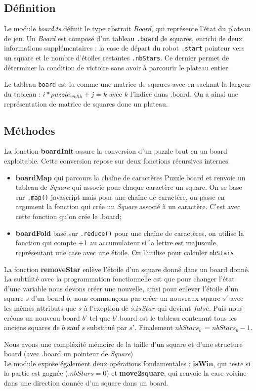 \subsection{Définition}

Le module \textit{board.ts} définit le type abstrait \textit{Board}, qui représente l'état du plateau de jeu. Un \textit{Board} est composé d'un tableau \texttt{.board} de squares, enrichi de deux informations supplémentaires : la case de départ du robot \texttt{.start} pointeur vers un square et le nombre d'étoiles restantes \texttt{.nbStars}. Ce dernier permet de déterminer la condition de victoire sans avoir à parcourir le plateau entier.

Le tableau \texttt{board} est lu comme une matrice de squares avec en sachant la largeur du tableau : $i * puzzle_{width} + j = k$ avec $k$ l’indice dans .board. On a ainsi une représentation de matrice de squares donc un plateau.

\subsection{Méthodes}

La fonction \textbf{boardInit} assure la conversion d'un puzzle brut en un board exploitable. Cette conversion repose sur deux fonctions récursives internes.
\begin{itemize}
	\item \textbf{boardMap} qui parcours la chaîne de caractères Puzzle.board et renvoie un tableau de \textit{Square} qui associe pour chaque caractère un square. On se base sur \texttt{.map()} javascript mais pour une chaîne de caractère, on passe en argument la fonction qui crée un \textit{Square} associé à un caractère. C’est avec cette fonction qu’on crée le .board;
	\item \textbf{boardFold} basé sur \texttt{.reduce()} pour une chaîne de caractères, on utilise la fonction qui compte +1 au accumulateur si la lettre est majuscule, représentant une case avec une étoile. On l'utilise pour calculer \texttt{nbStars}.
\end{itemize}

La fonction \textbf{removeStar} enlève l’étoile d’un square donné dans un board donné. La subtilité avec la programmation fonctionnelle est que pour changer l’état d’une variable nous devons créer une nouvelle, ainsi pour enlever l’étoile d’un square $s$ d’un board $b$, nous commençons par créer un nouveaux square $s'$ avec les mêmes attributs que $s$ à l'exeption de $s.isStar$ qui devient $false$. Puis nous créons un nouveau board $b'$ tel que $b'$.board est le tableau contenant tous les anciens squares de $b$ sauf $s$ substitué par $s'$. Finalement $nbStars_{b’} = nbStars_{b} - 1$.

Nous avons une compléxité mémoire de la taille d'un square et d'une structure board (avec .board un pointeur de \textit{Square}) 
\\

Le module expose également deux opérations fondamentales : \textbf{isWin}, qui teste si la partie est gagnée ($.nbStars = 0$) et \textbf{move2square}, qui renvoie la case voisine dans une direction donnée d’un square dans un board.
